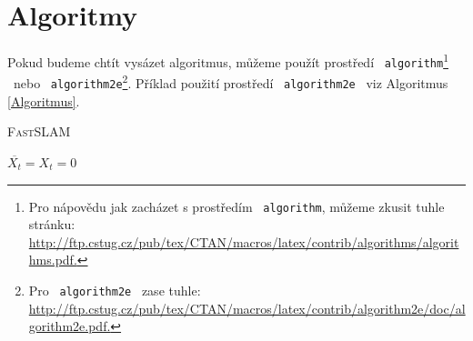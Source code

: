 \documentclass[a4paper,11pt, titlepage]{article}
\begin{document}
\section{Algoritmy}
\label{Algoritmy}

Pokud budeme chtít vysázet algoritmus, můžeme použít prostředí \  \texttt{algorithm}\footnote{Pro nápovědu jak zacházet s prostředím \ \texttt{algorithm}, můžeme zkusit tuhle stránku:\\ \href{http://ftp.cstug.cz/pub/tex/CTAN/macros/latex/contrib/algorithms/algorithms.pdf}{http://ftp.cstug.cz/pub/tex/CTAN/macros/latex/contrib/algorithms/algorithms.pdf.}} \ nebo \ \texttt{algorithm2e}\footnote{Pro \ \texttt{algorithm2e} \ zase tuhle: \href{http://ftp.cstug.cz/pub/tex/CTAN/macros/latex/contrib/algorithm2e/doc/algorithm2e.pdf}{http://ftp.cstug.cz/pub/tex/CTAN/macros/latex/contrib/algorithm2e/doc/algorithm2e.pdf.}}. Příklad použití prostředí \  \texttt{algorithm2e} \ viz Algoritmus \ref{Algoritmus}.

\bigskip

\begin{algorithm}[H]
\label{Algoritmus}
\SetNlSty{}{}{:}
\SetInd{8mm}{0cm}
\SetNlSkip{-0.43cm}
\caption{\textsc{FastSLAM}}
\BlankLine
\Indp
$\overline{X_t} = X_t = 0$\\
\end{algorithm}

\bigskip
\end{document}
